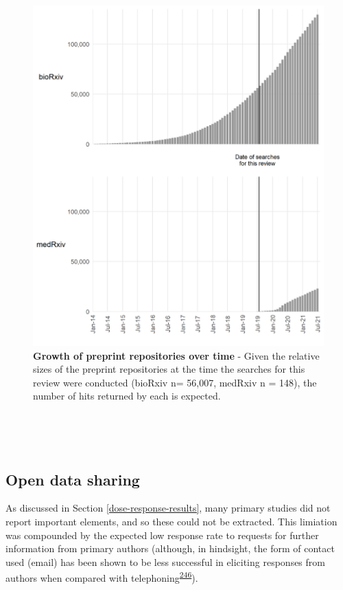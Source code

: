 \documentclass[a4paper, twoside]{templates/ociamthesis}
\begin{document}
\begin{figure}[H]
\includegraphics[width=1\linewidth]{figures/sys-rev/preprint_growth} \caption[Growth of preprint repositories over time]{\textbf{Growth of preprint repositories over time} - Given the relative sizes of the preprint repositories at the time the searches for this review were conducted (bioRxiv n= 56,007, medRxiv n = 148), the number of hits returned by each is expected.}\label{fig:preprintGrowth}
\end{figure}

~

~

\hypertarget{sys-rev-open-data}{%
\subsection{Open data sharing}\label{sys-rev-open-data}}

As discussed in Section \ref{dose-response-results}, many primary studies did not report important elements, and so these could not be extracted. This limiation was compounded by the expected low response rate to requests for further information from primary authors (although, in hindsight, the form of contact used (email) has been shown to be less successful in eliciting responses from authors when compared with telephoning\textsuperscript{\protect\hyperlink{ref-danko2019}{246}}).
\end{document}
